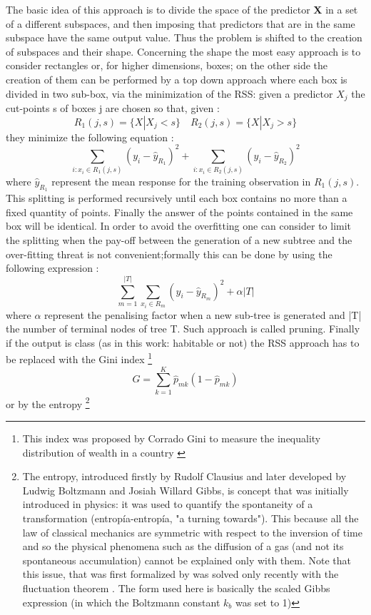 \documentclass[
12pt, %
a4paper, %
oneside, %
headinclude,footinclude, %
BCOR5mm, %
]{scrartcl}
\newcommand{\textgreek}[1]{\begingroup\fontencoding{LGR}\selectfont#1\endgroup}
\begin{document}
The basic idea of this approach is to divide the space of the predictor \textbf{X} in a set of a different subspaces, and then imposing that predictors that are in the same subspace have the same output value. Thus the problem is shifted to the creation of subspaces and their shape. Concerning the shape the most easy approach is to consider rectangles or, for higher dimensions, boxes; on the other side the creation of them can be performed by a top down approach where each box is divided in two sub-box, via the minimization of the RSS: given a predictor $X_{j}$ the cut-points s of boxes j are chosen so that, given \cite{james2013introduction}:   
\begin{equation}
R_{1}(j,s)= \{X | X_{j} < s \} \quad R_{2}(j,s)= \{X | X_{j} > s \}
\end{equation}
they minimize the following equation \cite{james2013introduction}: 
\begin{equation}
\sum_{i: x_{i} \in  R_{1}(j,s)}(y_{i}-\hat{y}_{R_{1}})^{2}+\sum_{i: x_{i} \in  R_{2}(j,s)}(y_{i}-\hat{y}_{R_{2}})^{2}
\end{equation}
where $\hat{y}_{R_{1}}$ represent the mean response for the training observation in $R_{1}(j,s)$. This splitting is performed recursively until each box contains no more than a fixed quantity of points. Finally the answer of the points contained in the same box will be identical. In order to avoid the overfitting one can consider to limit the splitting when the pay-off between the generation of a new subtree and the over-fitting threat is not convenient;formally this can be done by using the following expression \cite{james2013introduction}: 
\begin{equation}
\sum_{m=1}^{|T|}\sum_{x_{i}\in R_{m}}(y_{i}-\hat{y}_{R_{m}})^{2}+\alpha|T|
\end{equation}
where $\alpha$ represent the penalising factor when a new sub-tree is generated and |T| the number of terminal nodes of tree T. Such approach is called pruning. Finally if the output is class (as in this work: habitable or not) the RSS approach has to be replaced with the Gini index \footnote{This index was proposed by Corrado Gini to measure the inequality distribution of wealth in a country \cite{gini1912variabilita}}
\begin{equation}
G=\sum_{k=1}^{K}\hat{p}_{mk}(1-\hat{p}_{mk})
\end{equation}
or by the entropy \footnote{The entropy, introduced firstly by Rudolf Clausius and later developed by  Ludwig Boltzmann and Josiah Willard Gibbs, is concept that was initially introduced in physics: it was used to quantify the spontaneity of a transformation (\textgreek{entropía}-entropía, "a turning towards"). This because all the law of classical mechanics are symmetric with respect to the inversion of time and so the physical phenomena such as the diffusion of a gas (and not its spontaneous accumulation) cannot be explained only with them. Note that this issue, that was first formalized by \cite{loschmidt1876grosse,wu1975boltzmann}  was solved only recently with the fluctuation theorem \cite{evans1993probability,wang2002experimental}. The form used here is basically the scaled Gibbs expression (in which the Boltzmann constant $k_{b}$ was set to 1)}
\end{document}
